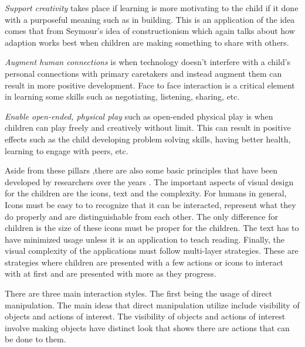 \textit{Support creativity} takes place if learning is more motivating to the child if it done with a purposeful meaning such as in building. This is an application of the idea comes that from Seymour's idea of constructionism which again talks about how adaption works best when children are making something to share with others.

\textit{Augment human connections} is when technology doesn't interfere with a child's personal connections with primary caretakers and instead augment them can result in more positive development. Face to face interaction is a critical element in learning some skills such as negotiating, listening, sharing, etc. 

\textit{Enable open-ended, physical play} such as open-ended physical play is when children can play freely and creatively without limit. This can result in positive effects such as the child developing problem solving skills, having better health, learning to  engage with peers, etc.

Aside from these pillars ,there are also some basic principles that have been developed by researchers over the years \cite{hourcade2008interaction}. The important aspects of visual design for the children are the icons, text and the complexity. For humans in general, Icons must be easy to to recognize that it can be interacted, represent what they do properly and are distinguishable from each other. The only difference for children is the size of these icons must be proper for the children. The text has to have minimized usage unless it is an application to teach reading. Finally, the visual complexity of the applications must follow multi-layer strategies. These are strategies where children are presented with a few actions or icons to interact with at first and are presented with more as they progress. 

There are three main interaction styles. The first being the usage of direct manipulation. The main ideas that direct manipulation utilize include visibility of objects and actions of interest. The visibility of objects and actions of interest involve making objects have distinct look that shows there are actions that can be done to them.

